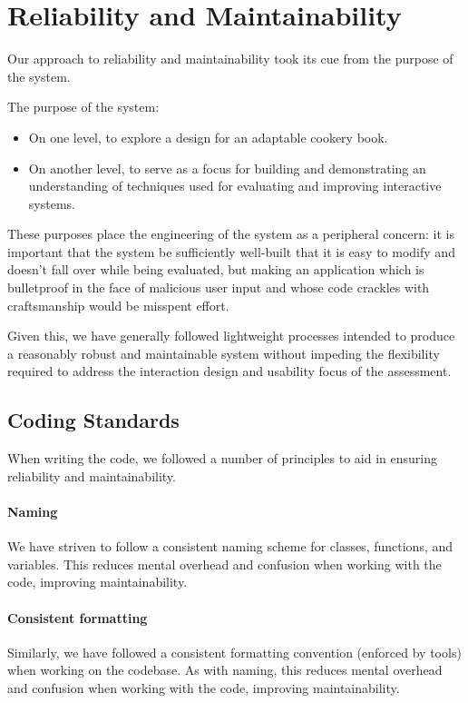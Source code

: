 \section{Reliability and Maintainability}

Our approach to reliability and maintainability took its cue from the
purpose of the system.

The purpose of the system:

\begin{itemize}
\item On one level, to explore a design for an adaptable cookery book.
\item On another level, to serve as a focus for building and
  demonstrating an understanding of techniques used for evaluating and
  improving interactive systems.
\end{itemize}

These purposes place the engineering of the system as a peripheral
concern: it is important that the system be sufficiently well-built
that it is easy to modify and doesn't fall over while being evaluated,
but making an application which is bulletproof in the face of
malicious user input and whose code crackles with craftsmanship would
be misspent effort.

Given this, we have generally followed lightweight processes intended
to produce a reasonably robust and maintainable system without
impeding the flexibility required to address the interaction design
and usability focus of the assessment.

\subsection{Coding Standards}

When writing the code, we followed a number of principles to aid in
ensuring reliability and maintainability.

\paragraph{Naming}
We have striven to follow a consistent naming scheme for classes,
functions, and variables. This reduces mental overhead and confusion
when working with the code, improving maintainability.

\paragraph{Consistent formatting}
Similarly, we have followed a consistent formatting convention
(enforced by tools) when working on the codebase. As with naming, this
reduces mental overhead and confusion when working with the code,
improving maintainability.

